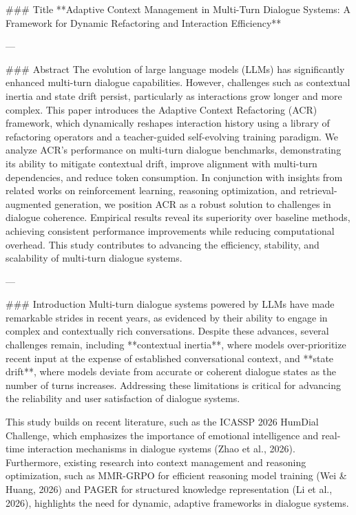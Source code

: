 ### Title
**Adaptive Context Management in Multi-Turn Dialogue Systems: A Framework for Dynamic Refactoring and Interaction Efficiency**

---

### Abstract
The evolution of large language models (LLMs) has significantly enhanced multi-turn dialogue capabilities. However, challenges such as contextual inertia and state drift persist, particularly as interactions grow longer and more complex. This paper introduces the Adaptive Context Refactoring (ACR) framework, which dynamically reshapes interaction history using a library of refactoring operators and a teacher-guided self-evolving training paradigm. We analyze ACR's performance on multi-turn dialogue benchmarks, demonstrating its ability to mitigate contextual drift, improve alignment with multi-turn dependencies, and reduce token consumption. In conjunction with insights from related works on reinforcement learning, reasoning optimization, and retrieval-augmented generation, we position ACR as a robust solution to challenges in dialogue coherence. Empirical results reveal its superiority over baseline methods, achieving consistent performance improvements while reducing computational overhead. This study contributes to advancing the efficiency, stability, and scalability of multi-turn dialogue systems.

---

### Introduction
Multi-turn dialogue systems powered by LLMs have made remarkable strides in recent years, as evidenced by their ability to engage in complex and contextually rich conversations. Despite these advances, several challenges remain, including **contextual inertia**, where models over-prioritize recent input at the expense of established conversational context, and **state drift**, where models deviate from accurate or coherent dialogue states as the number of turns increases. Addressing these limitations is critical for advancing the reliability and user satisfaction of dialogue systems.

This study builds on recent literature, such as the ICASSP 2026 HumDial Challenge, which emphasizes the importance of emotional intelligence and real-time interaction mechanisms in dialogue systems (Zhao et al., 2026). Furthermore, existing research into context management and reasoning optimization, such as MMR-GRPO for efficient reasoning model training (Wei & Huang, 2026) and PAGER for structured knowledge representation (Li et al., 2026), highlights the need for dynamic, adaptive frameworks in dialogue systems.

